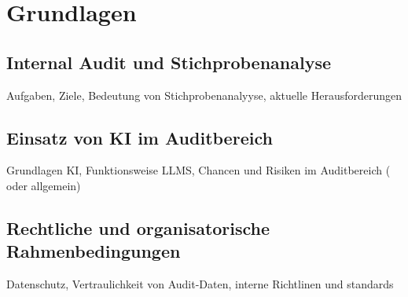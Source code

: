 \chapter{Grundlagen}

\section{Internal Audit und Stichprobenanalyse}

Aufgaben, Ziele, Bedeutung von Stichprobenanalyyse, aktuelle Herausforderungen


\section{Einsatz von KI im Auditbereich}
Grundlagen KI,
Funktionsweise LLMS, 
Chancen und Risiken im Auditbereich ( oder allgemein)

\section{Rechtliche und organisatorische Rahmenbedingungen}
Datenschutz, Vertraulichkeit von Audit-Daten, interne Richtlinen und standards